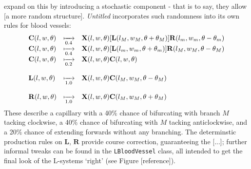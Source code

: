 \documentclass[a4paper, 11pt]{article}
\begin{document}
\begin{flushleft}

\vspace{5pt}\noindent
\citet{liuSimulationBloodVessels} expand on this by introducing a stochastic component - that is to say, they allow [a more random structure]. \textit{Untitled} incorporates such randomness into its own rules for blood vessels:
$$\begin{matrix*}[l]
\mathbf{C}(l,w,\theta) &\xmapsto[0.4]{} &\mathbf{X}(l,w,\theta)[\mathbf{L}(l_M,w_M,\theta+\theta_M)]\mathbf{R}(l_m,w_m,\theta-\theta_m) \\
\mathbf{C}(l,w,\theta) &\xmapsto[0.4]{} &\mathbf{X}(l,w,\theta)[\mathbf{L}(l_m,w_m,\theta+\theta_m)]\mathbf{R}(l_M,w_M,\theta-\theta_M) \\
\mathbf{C}(l,w,\theta) &\xmapsto[0.2]{} &\mathbf{X}(l,w,\theta)\mathbf{C}(l,w,\theta) \\
& & \\
\mathbf{L}(l,w,\theta) &\xmapsto[1.0]{} &\mathbf{X}(l,w,\theta)\mathbf{C}(l_M,w_M,\theta-\theta_M) \\
& & \\
\mathbf{R}(l,w,\theta) &\xmapsto[1.0]{} &\mathbf{X}(l,w,\theta)\mathbf{C}(l_M,w_M,\theta+\theta_M)
\end{matrix*}$$
These describe a capillary with a 40\% chance of bifurcating with branch $M$ tacking clockwise, a 40\% chance of bifurcating with $M$ tacking anticlockwise, and a 20\% chance of extending forwards without any branching. The determinstic production rules on $\mathbf{L}$, $\mathbf{R}$ provide course correction, guaranteeing the [...]; further informal tweaks can be found in the \texttt{LBloodVessel} class, all intended to get the final look of the L-systems `right' (see Figure [reference]). 

\vspace{5pt}


\end{flushleft}
\end{document}
